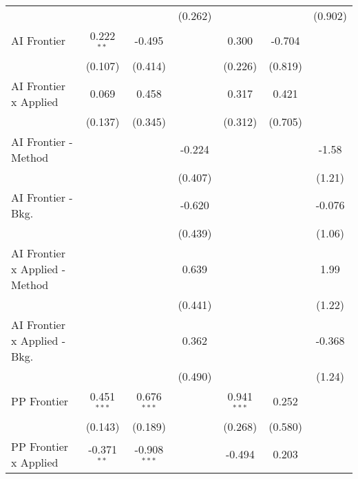 \begin{tabular}{lcccccc}
                                  &               &                & (0.262)        &               &              & (0.902)\\   
   AI Frontier                    & 0.222$^{**}$  & -0.495         &                & 0.300         & -0.704       &   \\   
                                  & (0.107)       & (0.414)        &                & (0.226)       & (0.819)      &   \\   
   AI Frontier x Applied          & 0.069         & 0.458          &                & 0.317         & 0.421        &   \\   
                                  & (0.137)       & (0.345)        &                & (0.312)       & (0.705)      &   \\   
   AI Frontier - Method           &               &                & -0.224         &               &              & -1.58\\   
                                  &               &                & (0.407)        &               &              & (1.21)\\   
   AI Frontier - Bkg.             &               &                & -0.620         &               &              & -0.076\\   
                                  &               &                & (0.439)        &               &              & (1.06)\\   
   AI Frontier x Applied - Method &               &                & 0.639          &               &              & 1.99\\   
                                  &               &                & (0.441)        &               &              & (1.22)\\   
   AI Frontier x Applied - Bkg.   &               &                & 0.362          &               &              & -0.368\\   
                                  &               &                & (0.490)        &               &              & (1.24)\\   
   PP Frontier                    & 0.451$^{***}$ & 0.676$^{***}$  &                & 0.941$^{***}$ & 0.252        &   \\   
                                  & (0.143)       & (0.189)        &                & (0.268)       & (0.580)      &   \\   
   PP Frontier x Applied          & -0.371$^{**}$ & -0.908$^{***}$ &                & -0.494        & 0.203        &   \\   

\end{tabular}
